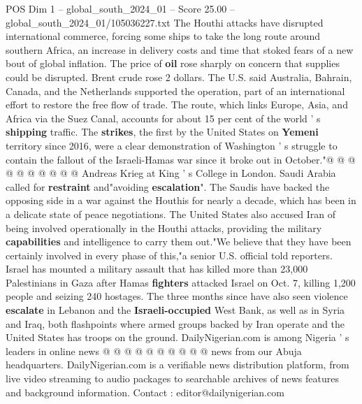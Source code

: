 \begin{textsample}{POS Dim 1 – global\_south\_2024\_01 – Score 25.00 – global\_south\_2024\_01/105036227.txt}
The Houthi attacks have disrupted international commerce, forcing some ships to take the long route around southern Africa, an increase in delivery costs and time that stoked fears of a new bout of global inflation.
The price of \textbf{oil} rose sharply on concern that supplies could be disrupted.
Brent crude rose 2 dollars.
The U.S. said Australia, Bahrain, Canada, and the Netherlands supported the operation, part of an international effort to restore the free flow of trade.
The route, which links Europe, Asia, and Africa via the Suez Canal, accounts for about 15 per cent of the world ' s \textbf{shipping} traffic.
The \textbf{strikes}, the first by the United States on \textbf{Yemeni} territory since 2016, were a clear demonstration of Washington ' s struggle to contain the fallout of the Israeli-Hamas war since it broke out in October."@ @ @ @ @ @ @ @ @ @ Andreas Krieg at King ' s College in London.
Saudi Arabia called for \textbf{restraint} and"avoiding \textbf{escalation}".
The Saudis have backed the opposing side in a war against the Houthis for nearly a decade, which has been in a delicate state of peace negotiations.
The United States also accused Iran of being involved operationally in the Houthi attacks, providing the military \textbf{capabilities} and intelligence to carry them out."We believe that they have been certainly involved in every phase of this,"a senior U.S. official told reporters.
Israel has mounted a military assault that has killed more than 23,000 Palestinians in Gaza after Hamas \textbf{fighters} attacked Israel on Oct. 7, killing 1,200 people and seizing 240 hostages.
The three months since have also seen violence \textbf{escalate} in Lebanon and the \textbf{Israeli-occupied} West Bank, as well as in Syria and Iraq, both flashpoints where armed groups backed by Iran operate and the United States has troops on the ground.
DailyNigerian.com is among Nigeria ' s leaders in online news @ @ @ @ @ @ @ @ @ @ news from our Abuja headquarters.
DailyNigerian.com is a verifiable news distribution platform, from live video streaming to audio packages to searchable archives of news features and background information.
Contact : editor@dailynigerian.com

\end{textsample}
